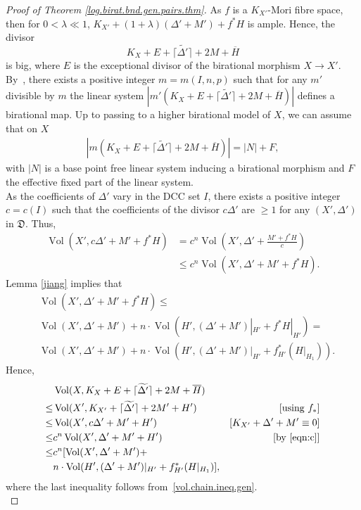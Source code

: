 \documentclass{amsart}[12pt,a4paper]
\theoremstyle{definition}
\DeclareMathOperator{\Vol}{\mathrm{Vol}}
\begin{document}
\begin{proof}[Proof of Theorem \ref{log.birat.bnd.gen.pairs.thm}]
As $f$ is a $K_{X'}$-Mori fibre space, then for $0< \lambda \ll1$, $K_{X'}+(1+\lambda)(\Delta'+M')+f^\ast H$ is ample.
Hence, the divisor
\[
 K_X+E +\lceil \widetilde{\Delta'} \rceil+ 2M + \overline{H}
 \]
 is big, where $E$ is the exceptional divisor of the birational morphism $X \to X'$.
By~\cite[Theorem 1.3]{bir.zhang}, there exists a positive integer $m=m(I, n, p)$ such that for any $m'$ divisible by $m$ the linear system $|m'(K_X+E +\lceil \widetilde{\Delta'} \rceil+ 2M + \overline{H})|$ defines a birational map.
Up to passing to a higher birational model of $X$, we can assume that on $X$ 
\begin{align}
\label{eqn:N}
|m(K_X+E +\lceil \widetilde{\Delta'} \rceil+ 2M + \overline{H})|= |N| + F,
\end{align}
with $|N|$ is a base point free linear system inducing a birational morphism and $F$ the effective fixed part of the linear system.
\\
As the coefficients of $\Delta'$ vary in the DCC set $I$, there exists a positive integer $c=c(I)$ such that the coefficients of the divisor $c\Delta'$ are $\geq 1$ for any $(X', \Delta')$ in $\mathfrak{D}$. 
Thus,
\begin{align}
\label{eqn:c}
\Vol(X', c\Delta'+ M'+ f^\ast H) & = c^n\Vol(X', \Delta'+ \frac{M'+ f^\ast H}{c}) \\
\nonumber
&\leq c^n\Vol(X', \Delta'+ M' + f^\ast H).
\end{align}
\noindent
Lemma \ref{jiang} implies that 
\begin{align}
\nonumber
&\Vol(X', \Delta'+ M' + f^\ast H) \leq \\
\label{vol.chain.ineq.gen}
& \Vol(X', \Delta'+M')+  n \cdot \Vol(H', (\Delta' +M')|_{H'}+f^* H|_{H'})=\\
\nonumber
& \Vol(X', \Delta'+M')+  n \cdot \Vol(H', (\Delta' +M')|_{H'}+f^*_{H'} (H|_{H_1})).
\end{align}
Hence, 
  \begin{align} 
\nonumber
&\Vol(X, K_X+E +\lceil \widetilde{\Delta'} \rceil+ 2M + \overline{H}) \\
\nonumber
\leq  & 
\Vol(X', K_{X'}+\lceil \widetilde{\Delta'} \rceil+ 2M' + H')
& \hfill[\text{using $f_{\ast}$}]
\\ 
\label{vol.ineq}
\leq  & \Vol(X', c\Delta'+ M'+H') 
& \hfill[K_{X'} + \Delta'+M' \equiv 0]  
\\ 
\nonumber 
\leq & c^n \Vol(X', \Delta'+M'+H')
& \hfill[\textrm{by } \eqref{eqn:c}]
\\
\nonumber 
\leq &  c^{n} [\Vol(X', \Delta'+M') +
\\
\nonumber
& n \cdot \Vol(H', (\Delta'+M')|_{H'}+ f^*_{H'} (H|_{H_1})],
	\end{align}
where the last inequality follows from~\eqref{vol.chain.ineq.gen}.\\


\end{proof}
\end{document}
